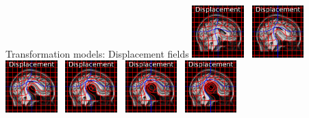 \documentclass{beamer}
\begin{document}
\begin{frame}{Transformation models: Displacement fields}
\includegraphics[width=0.15\textwidth]{tform_models_disp_1}~
\includegraphics[width=0.15\textwidth]{tform_models_disp_2}~
\includegraphics[width=0.15\textwidth]{tform_models_disp_3}~
\includegraphics[width=0.15\textwidth]{tform_models_disp_4}~
\includegraphics[width=0.15\textwidth]{tform_models_disp_5}~
\includegraphics[width=0.15\textwidth]{tform_models_disp_6}

\end{frame}
\end{document}
